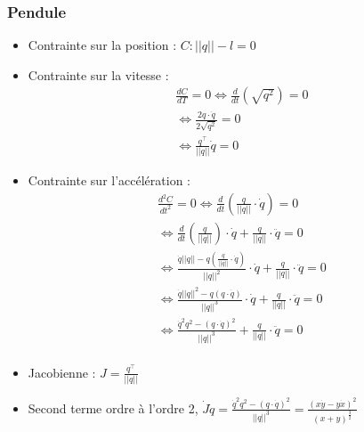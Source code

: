 \documentclass[11pt, letterpaper]{report}
\begin{document}
    \subsubsection{Pendule}\label{subsubsec:pendule}
    \begin{itemize}
        \item Contrainte sur la position : $C : ||q|| - l = 0$\\
        \item Contrainte sur la vitesse :
        \begin{gather*}
            \frac{dC}{dT} = 0 \Leftrightarrow \frac{d}{dt}(\sqrt{q^2}) = 0\\
            \Leftrightarrow \frac{2q \cdot \dot{q}}{2\sqrt{q^2}} = 0\\
            \Leftrightarrow \frac{q^\intercal}{||q||} \dot{q} = 0
        \end{gather*}
        \item Contrainte sur l'accélération :
        \begin{gather*}
            \frac{d^2C}{dt^2} = 0 \Leftrightarrow \frac{d}{dt}\left(\frac{q}{||q||} \cdot \dot{q}\right) = 0\\
            \Leftrightarrow \frac{d}{dt}\left(\frac{q}{||q||}\right) \cdot \dot{q} + \frac{q}{||q||} \cdot \ddot{q} = 0\\
            \Leftrightarrow
                \frac{\dot{q}||q|| - q \left(\frac{q}{||q||} \cdot \dot{q}\right)}{||q||^2} \cdot \dot{q}+ \frac{q}{||q||} \cdot \ddot{q} = 0\\
            \Leftrightarrow \frac{\dot{q}||q||^2 - q ( q \cdot \dot{q})} {||q||^3} \cdot \dot{q} + \frac{q}{||q||} \cdot \ddot{q} = 0\\
            \Leftrightarrow \frac{\dot{q}^2 q^2 - (q \cdot \dot{q})^2} {||q||^3} + \frac{q}{||q||} \cdot \ddot{q} = 0\\
        \end{gather*}
        \item Jacobienne : $J = \frac{q^\intercal}{||q||}$
        \item Second terme ordre à l'ordre 2,  $\dot{J}\dot{q} = \frac{\dot{q}^2 q^2 - (q \cdot \dot{q})^2} {||q||^3} = \frac{(x \dot{y} - y \dot{x})^2}{(x + y)^\frac{3}{2}}$
    \end{itemize}
\end{document}
